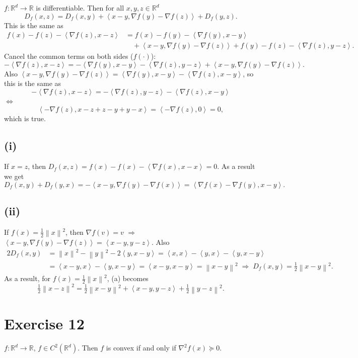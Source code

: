 \documentclass[11pt,a4paper]{article}
\newcommand{\R}{\mathbb{R}}
\newcommand{\norm}[1]{\left\| #1 \right\|}
\newcommand{\ip}[2]{\left\langle #1, #2 \right\rangle}
\begin{document}
$f : \R^d \to \R$ is differentiable. Then for all $x, y, z \in \R^d$
\[
  D_f(x,z) = D_f(x,y) + \ip{x-y}{\nabla f(y) - \nabla f(z)} + D_f(y,z). \tag{a}
\]
This is the same as
\begin{align*}
  f(x) - f(z) - \ip{\nabla f(z)}{x-z}
  &= f(x) - f(y) - \ip{\nabla f(y)}{x-y} \\
  &\quad + \ip{x-y}{\nabla f(y) - \nabla f(z)} + f(y) - f(z) - \ip{\nabla f(z)}{y-z}.
\end{align*}
Cancel the common terms on both sides ($f(\cdot)$):
\[
  -\ip{\nabla f(z)}{x-z}
  = -\ip{\nabla f(y)}{x-y} - \ip{\nabla f(z)}{y-z} + \ip{x-y}{\nabla f(y) - \nabla f(z)}.
\]
Also $\ip{x-y}{\nabla f(y) - \nabla f(z)} = \ip{\nabla f(y)}{x-y} - \ip{\nabla f(z)}{x-y}$,
so this is the same as
\[
  -\ip{\nabla f(z)}{x-z} = -\ip{\nabla f(z)}{y-z} - \ip{\nabla f(z)}{x-y}
\]
$\iff$
\[
  \ip{-\nabla f(z)}{x - z + z - y + y - x} = \ip{-\nabla f(z)}{0} = 0,
\]
which is true.

\subsection*{(i)}
If $x = z$, then $D_f(x,z) = f(x) - f(x) - \ip{\nabla f(x)}{x-x} = 0$. As a result we get
\[
  D_f(x,y) + D_f(y,x) = -\ip{x-y}{\nabla f(y) - \nabla f(x)} = \ip{\nabla f(x) - \nabla f(y)}{x-y}.
\]

\subsection*{(ii)}
If $f(x) = \frac12\norm{x}^2$, then $\nabla f(v) = v$ $\Rightarrow$
$\ip{x-y}{\nabla f(y) - \nabla f(z)} = \ip{x-y}{y-z}$. Also
\begin{align*}
  2D_f(x,y) &= \norm{x}^2 - \norm{y}^2 - 2\ip{y}{x-y}
  = \ip{x}{x} - \ip{y}{x} - \ip{y}{x-y} \\
  &= \ip{x-y}{x} - \ip{y}{x-y} = \ip{x-y}{x-y} = \norm{x-y}^2
  \;\Rightarrow\; D_f(x,y) = \tfrac12\norm{x-y}^2 .
\end{align*}
As a result, for $f(x) = \frac12\norm{x}^2$, (a) becomes
\[
  \tfrac12\norm{x-z}^2 = \tfrac12\norm{x-y}^2 + \ip{x-y}{y-z} + \tfrac12\norm{y-z}^2 .
\]

\section*{Exercise 12}

$f : \R^d \to \R$, $f \in C^2(\R^d)$. Then $f$ is convex if and only if $\nabla^2 f(x) \succeq 0$.
\end{document}
